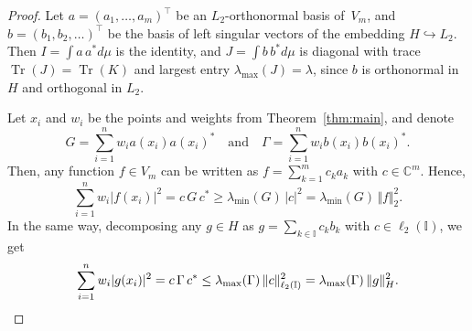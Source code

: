 \documentclass[10pt,a4paper]{amsart}
\DeclareMathOperator{\Tr}{Tr}
\newcommand{\C}{\mathbb{C}}
\newcommand{\II}{\mathbb{I}}
\begin{document}
\begin{proof}
Let $a=(a_1,\hdots,a_m)^\top$ be an $L_2$-orthonormal basis of~$V_m$,
and $b=(b_1,b_2,\hdots)^\top$ be the basis of left singular vectors of the embedding $ H\hookrightarrow L_2$.
Then $I=\int a\,a^*d\mu$ is the identity, and
$J=\int b\,b^*d\mu$
is diagonal with trace $\Tr(J) =\Tr(K)$ and largest entry $\lambda_{\max}(J) = \lambda$,
since $b$ is orthonormal in $H$ and orthogonal in $L_2$.

Let $x_i$ and $w_i$ be the points and weights from Theorem~\ref{thm:main}, and denote
\[
G=\sum_{i=1}^{n} w_ia(x_i)a(x_i)^*\quad\text{and}\quad
\Gamma = \sum_{i=1}^{n} w_ib(x_i)b(x_i)^*.
\]
Then, any function $f\in V_m$ can be written as $f=\sum_{k=1}^{m} c_k a_k$ 
with $c\in \C^m$. Hence,
\[
 \sum_{i=1}^n w_i|f(x_i)|^2 = c\,G\,c^*
\geq \lambda_{\min}(G)\,|c|^2
 =\lambda_{\min}(G)\,\Vert f\Vert_2^2.
\]
In the same way, decomposing any $g\in H$ as $g=\sum_{k\in \mathbb I} c_k b_k$ with $c\in \ell_2(\II)$, we get\vspace{-4mm}
\[
 \sum_{i=1}^n w_i|g(x_i)|^2 = c\,\Gamma\,c^*
 \leq \lambda_{\max}(\Gamma)\,\Vert c \Vert_{\ell_2(\II)}^2
 =\lambda_{\max}(\Gamma)\,\Vert g \Vert_{H}^2.\qedhere
\]
\end{proof}
\end{document}
